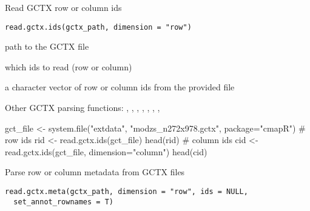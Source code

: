 \documentclass[letterpaper]{book}
\begin{document}
%
\begin{Description}\relax
Read GCTX row or column ids
\end{Description}
%
\begin{Usage}
\begin{verbatim}
read.gctx.ids(gctx_path, dimension = "row")
\end{verbatim}
\end{Usage}
%
\begin{Arguments}
\begin{ldescription}
\item[\code{gctx\_path}] path to the GCTX file

\item[\code{dimension}] which ids to read (row or column)
\end{ldescription}
\end{Arguments}
%
\begin{Value}
a character vector of row or column ids from the provided file
\end{Value}
%
\begin{SeeAlso}\relax
Other GCTX parsing functions: ,
, ,
, ,
, ,
\end{SeeAlso}
%
\begin{Examples}
\begin{ExampleCode}
gct_file <- system.file("extdata", "modzs_n272x978.gctx", package="cmapR")
# row ids
rid <- read.gctx.ids(gct_file)
head(rid)
# column ids
cid <- read.gctx.ids(gct_file, dimension="column")
head(cid)

\end{ExampleCode}
\end{Examples}
%
\begin{Description}\relax
Parse row or column metadata from GCTX files
\end{Description}
%
\begin{Usage}
\begin{verbatim}
read.gctx.meta(gctx_path, dimension = "row", ids = NULL,
  set_annot_rownames = T)
\end{verbatim}
\end{Usage}
\end{document}
